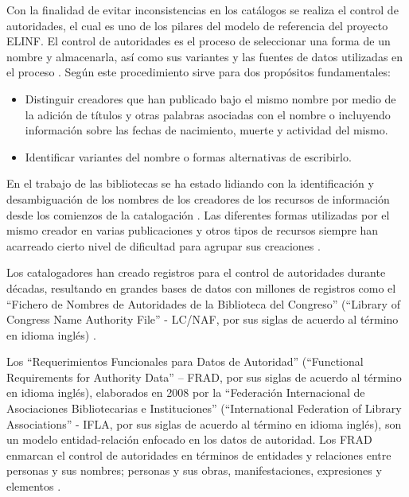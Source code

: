 Con la finalidad de evitar inconsistencias en los catálogos se realiza el control de autoridades, el cual es uno de los pilares del modelo de referencia del proyecto ELINF. El control de autoridades es el proceso de seleccionar una forma de un nombre y almacenarla, así como sus variantes y las fuentes de datos utilizadas en el proceso \citep{Sandberg2016}. Según \cite{Carrasco2016} este procedimiento sirve para dos propósitos fundamentales:

\begin{itemize}
\item Distinguir creadores que han publicado bajo el mismo nombre por medio de la adición de títulos y otras palabras asociadas con el nombre o incluyendo información sobre las fechas de nacimiento, muerte y actividad del mismo.
\item Identificar variantes del nombre o formas alternativas de escribirlo.
\end{itemize}

En el trabajo de las bibliotecas se ha estado lidiando con la identificación y desambiguación de los nombres de los creadores de los recursos de información desde los comienzos de la catalogación \citep{Harper2007}. Las diferentes formas utilizadas por el mismo creador en varias publicaciones y otros tipos de recursos siempre han acarreado cierto nivel de dificultad para agrupar sus creaciones \citep{Harper2007}.

Los catalogadores han creado registros para el control de autoridades durante décadas, resultando en grandes bases de datos con millones de registros como el ``Fichero de Nombres de Autoridades de la Biblioteca del Congreso'' (``Library of Congress Name Authority File'' - LC/NAF, por sus siglas de acuerdo al término en idioma inglés) \citep{Sandberg2016}.

Los ``Requerimientos Funcionales para Datos de Autoridad'' (``Functional Requirements for Authority Data'' – FRAD, por sus siglas de acuerdo al término en idioma inglés), elaborados en 2008 por la ``Federación Internacional de Asociaciones Bibliotecarias e Instituciones'' (``International Federation of Library Associations'' - IFLA, por sus siglas de acuerdo al término en idioma inglés), son un modelo entidad-relación enfocado en los datos de autoridad. Los FRAD enmarcan el control de autoridades en términos de entidades y relaciones entre personas y sus nombres; personas y sus obras, manifestaciones, expresiones y elementos \citep{InternationalFederationofLibraryAssociationsandInstitutions2009,Sandberg2016}.

